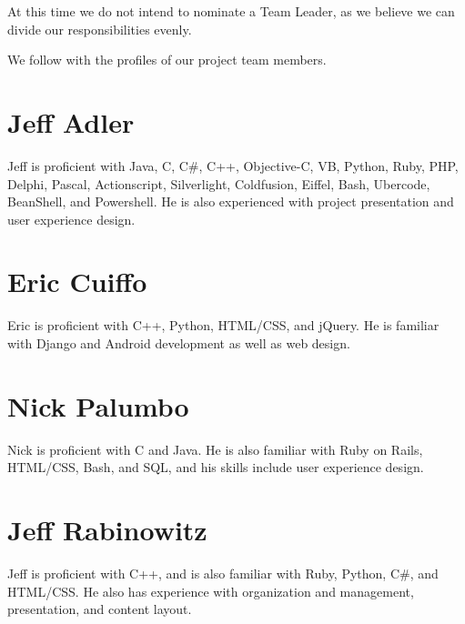 \documentclass[11pt,letterpaper,oneside]{memoir}
\begin{document}
At this time we do not intend to nominate a Team Leader, as we believe we can 
divide our responsibilities evenly.

We follow with the profiles of our project team members.

\section{Jeff Adler}

Jeff is proficient with Java, C, C\#, C++, Objective-C, VB, Python, Ruby,
PHP, Delphi, Pascal, Actionscript, Silverlight, Coldfusion,
Eiffel, Bash, Ubercode, BeanShell, and Powershell. He is also experienced
with project presentation and user experience design.

\section{Eric Cuiffo}

Eric is proficient with C++, Python, HTML/CSS, and jQuery. He is 
familiar with Django and Android development as well as web design.

\section{Nick Palumbo}

Nick is proficient with C and Java. He is also familiar with Ruby on Rails,
HTML/CSS, Bash, and SQL, and his skills include user experience design.

\section{Jeff Rabinowitz}

Jeff is proficient with C++, and is also familiar with Ruby, Python,
C\#, and HTML/CSS. He also has experience with organization and management,
presentation, and content layout.
\end{document}
